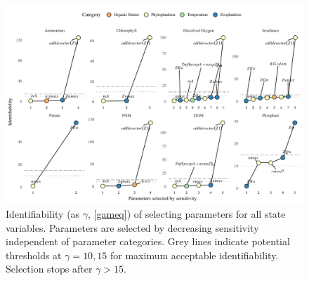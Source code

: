 \documentclass[letterpaper,12pt,oneside]{article}\usepackage[]{graphicx}\usepackage[]{color}
\begin{document}
\begin{figure}[!ht]

{\centering \includegraphics[width=\textwidth]{figs/heurist_stts-1} 

}

\caption[Identifiability (as $\gamma$, \cref{gameq}) of selecting parameters for all state variables]{Identifiability (as $\gamma$, \cref{gameq}) of selecting parameters for all state variables. Parameters are selected by decreasing sensitivity independent of parameter categories. Grey lines indicate potential thresholds at $\gamma = 10, 15$ for maximum acceptable identifiability. Selection stops after $\gamma > 15$.}\label{fig:heurist_stts}
\end{figure}
\end{document}
